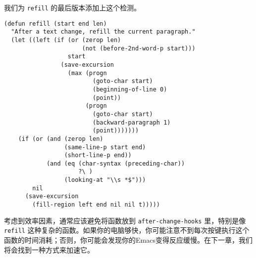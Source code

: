 我们为 \texttt{refill} 的最后版本添加上这个检测。

\begin{verbatim}
(defun refill (start end len)
  "After a text change, refill the current paragraph."
  (let ((left (if (or (zerop len)
                      (not (before-2nd-word-p start)))
                  start
                (save-excursion
                  (max (progn
                         (goto-char start)
                         (beginning-of-line 0)
                         (point))
                       (progn
                         (goto-char start)
                         (backward-paragraph 1)
                         (point)))))))
    (if (or (and (zerop len)
                 (same-line-p start end)
                 (short-line-p end))
            (and (eq (char-syntax (preceding-char))
                     ?\ )
                 (looking-at "\\s *$")))
        nil
      (save-excursion
        (fill-region left end nil nil t)))))
\end{verbatim}

考虑到效率因素，通常应该避免将函数放到 \texttt{after-change-hooks} 里，特别是像 \texttt{refill} 这种复杂的函数。如果你的电脑够快，你可能注意不到每次按键执行这个函数的时间消耗；否则，你可能会发现你的Emacs变得反应缓慢。在下一章，我们将会找到一种方式来加速它。
